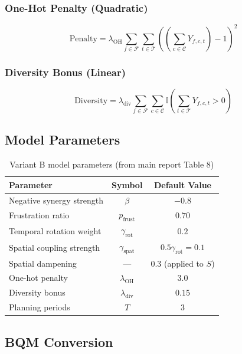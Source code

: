 \documentclass[11pt,a4paper]{article}
\begin{document}
\subsubsection{One-Hot Penalty (Quadratic)}
\begin{equation}
\text{Penalty} = \lambda_{\text{OH}} \sum_{f \in \mathcal{F}} \sum_{t \in \mathcal{T}} \left( \left(\sum_{c \in \mathcal{C}} Y_{f,c,t}\right) - 1 \right)^2
\end{equation}

\subsubsection{Diversity Bonus (Linear)}
\begin{equation}
\text{Diversity} = \lambda_{\text{div}} \sum_{f \in \mathcal{F}} \sum_{c \in \mathcal{C}} \mathbb{I}\left(\sum_{t \in \mathcal{T}} Y_{f,c,t} > 0\right)
\end{equation}

\subsection{Model Parameters}

\begin{table}[H]
\centering
\caption{Variant B model parameters (from main report Table 8)}
\label{tab:variant_b_params}
\begin{tabular}{@{}lcc@{}}
\toprule
\textbf{Parameter} & \textbf{Symbol} & \textbf{Default Value} \\
\midrule
Negative synergy strength & $\beta$ & $-0.8$ \\
Frustration ratio & $p_{\text{frust}}$ & $0.70$ \\
Temporal rotation weight & $\gamma_{\text{rot}}$ & $0.2$ \\
Spatial coupling strength & $\gamma_{\text{spat}}$ & $0.5 \gamma_{\text{rot}} = 0.1$ \\
Spatial dampening & --- & $0.3$ (applied to $S$) \\
One-hot penalty & $\lambda_{\text{OH}}$ & $3.0$ \\
Diversity bonus & $\lambda_{\text{div}}$ & $0.15$ \\
Planning periods & $T$ & $3$ \\
\bottomrule
\end{tabular}
\end{table}

\subsection{BQM Conversion}
\end{document}
